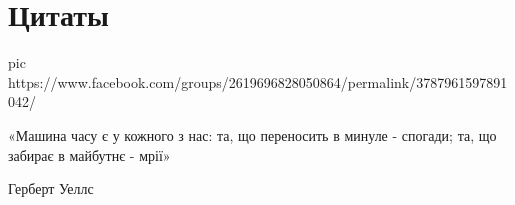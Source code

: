  
 
 

\section{Цитаты}

\ifcmt
pic https://www.facebook.com/groups/2619696828050864/permalink/3787961597891042/
\fi

«Машина часу є у кожного з нас: та, що переносить в минуле - спогади; та, що
забирає в майбутнє - мрії»

Герберт Уеллс
